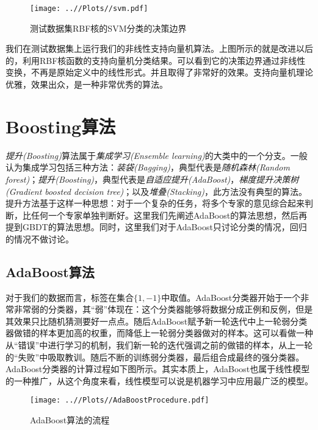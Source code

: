 \documentclass[UTF8, 12pt]{ctexart}
\begin{document}
\begin{figure}[H]
	\centering
	\texttt{[image: ..//Plots//svm.pdf]}
	\caption{测试数据集RBF核的SVM分类的决策边界}
	\label{Fig:7}
	\vspace{-0.5em}
\end{figure}

我们在测试数据集上运行我们的非线性支持向量机算法。上图所示的就是改进以后的，利用RBF核函数的支持向量机分类结果。可以看到它的决策边界通过非线性变换，不再是原始定义中的线性形式。并且取得了非常好的效果。支持向量机理论优雅，效果出众，是一种非常优秀的算法。

\section{Boosting算法}
\emph{提升(Boosting)}算法属于\emph{集成学习(Ensemble learning)}的大类中的一个分支。一般认为集成学习包括三种方法：\emph{装袋(Bagging)}，典型代表是\emph{随机森林(Random forest)}；\emph{提升(Boosting)}，典型代表是\emph{自适应提升(AdaBoost)}，\emph{梯度提升决策树(Gradient boosted decision tree)}；以及\emph{堆叠(Stacking)}，此方法没有典型的算法。提升方法基于这样一种思想：对于一个复杂的任务，将多个专家的意见综合起来判断，比任何一个专家单独判断好\cite{李航2012统计学习方法}。这里我们先阐述AdaBoost的算法思想，然后再提到GBDT的算法思想。同时，这里我们对于AdaBoost只讨论分类的情况，回归的情况不做讨论。

\subsection{AdaBoost算法}
对于我们的数据而言，标签在集合$\{1, -1\}$中取值。AdaBoost分类器开始于一个非常非常弱的分类器，其“弱”体现在：这个分类器能够将数据分成正例和反例，但是其效果只比随机猜测要好一点点。随后AdaBoost赋予新一轮迭代中上一轮弱分类器做错的样本更加高的权重，而降低上一轮弱分类器做对的样本。这可以看做一种从“错误”中进行学习的机制，我们新一轮的迭代强调之前的做错的样本，从上一轮的“失败”中吸取教训。随后不断的训练弱分类器，最后组合成最终的强分类器。AdaBoost分类器的计算过程如下图所示。其实本质上，AdaBoost也属于线性模型的一种推广，从这个角度来看，线性模型可以说是机器学习中应用最广泛的模型。

\begin{figure}[H]
	\centering
	\texttt{[image: ..//Plots//AdaBoostProcedure.pdf]}
	\caption{AdaBoost算法的流程}
	\label{Fig:8}
	\vspace{-0.5em}
\end{figure}
\end{document}
